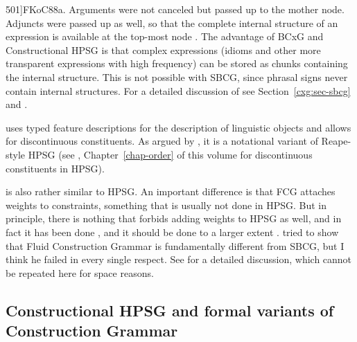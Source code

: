 \documentclass[output=paper
	        ,collection
	        ,collectionchapter
 	        ,biblatex
                ,babelshorthands
                ,newtxmath
                ,draftmode
                ,colorlinks, citecolor=brown
]{langscibook}
\begin{document}
  501]{FKoC88a}. Arguments were not canceled but
passed up to the mother node. Adjuncts were passed up as well, so that the complete internal
structure of an expression is available at the top-most node \citep[]{KF99a}. The advantage of BCxG and
Constructional HPSG \citep{Sag97a} is that complex expressions (\eg idioms and other more transparent expressions
with high frequency) can be stored as chunks containing the internal structure. This is not possible
with SBCG, since phrasal signs never contain internal structures. For a detailed discussion of \sbcg
see Section~\ref{cxg:sec-sbcg} and \citet[Section~10.6.2]{MuellerGT-Eng1}.

 \citep{BC2005a} uses typed feature descriptions for the description of
linguistic objects and allows for discontinuous constituents. As
argued by \citet[Section~10.6.3]{MuellerGT-Eng1}, it is a notational variant of Reape-style HPSG
\citep{Reape94a} (see \citealt[Section~\ref{sec-domains}]{chapters/order}, Chapter~\ref{chap-order}
of this volume for discontinuous constituents in HPSG).

 is also rather similar to HPSG. An important difference is that FCG attaches
weights to constraints, something that is usually not done in HPSG. But in principle, there is
nothing that forbids adding weights to HPSG as well, and in fact it has been done \citep{Brew95a,BC99a,MT2008a-u}, and it should be
done to a larger extent \citep{Miller2013a}.  tried to show that
Fluid Construction Grammar is fundamentally different from SBCG, but I think he failed in every
single respect. See \citet{MuellerFCG} for a detailed discussion, which cannot be repeated here for
space reasons.




\subsection{Constructional HPSG and formal variants of Construction Grammar}
\end{document}
